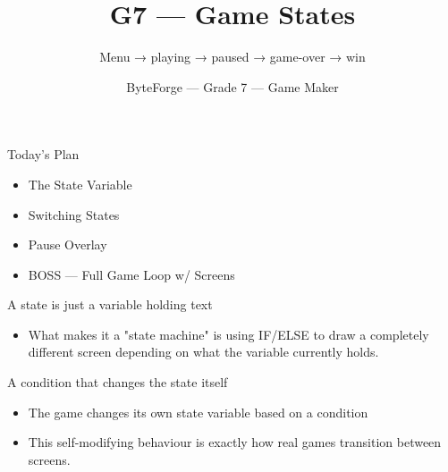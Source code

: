 \documentclass[aspectratio=169]{beamer}
\title{G7 — Game States}
\subtitle{Menu → playing → paused → game-over → win}
\author{ByteForge --- Grade 7 --- Game Maker}
\date{}
\begin{document}
\begin{frame}
    \titlepage
\end{frame}

\begin{frame}{Today's Plan}
    \begin{itemize}
        \item The State Variable
        \item Switching States
        \item Pause Overlay
        \item[$\bigstar$] BOSS --- Full Game Loop w/ Screens
    \end{itemize}
\end{frame}

\begin{frame}{A state is just a variable holding text}
    \large
    \begin{itemize}
        \item What makes it a "state machine" is using IF/ELSE to draw a completely different screen depending on what the variable currently holds.
    \end{itemize}

    \begin{center}
    \end{center}
\end{frame}


\begin{frame}{A condition that changes the state itself}
    \large
    \begin{itemize}
        \item The game changes its own state variable based on a condition
        \item This self-modifying behaviour is exactly how real games transition between screens.
    \end{itemize}
\end{frame}
\end{document}
